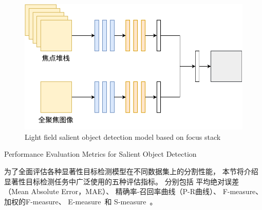 %
%
\begin{figure}[!ht]
	\centering
	\includegraphics[width=0.80\linewidth]{figures/chapter2/model_of_fs_inputs}
	{Light field salient object detection model based on focus stack}  
	\label{cpt2_fig9:model_of_fs_inputs}
\end{figure}





{Performance Evaluation Metrics for Salient Object Detection}



为了全面评估各种显著性目标检测模型在不同数据集上的分割性能，
本节将介绍显著性目标检测任务中广泛使用的五种评估指标。
分别包括
平均绝对误差（Mean Absolute Error，MAE）、
精确率-召回率曲线（P-R曲线）、
F-measure\cite{achanta2009frequency}、
加权的F-measure\cite{margolin2014evaluate}、
E-measure~\cite{fan2018enhanced}和
S-measure~\cite{fan2017structure}。\par






